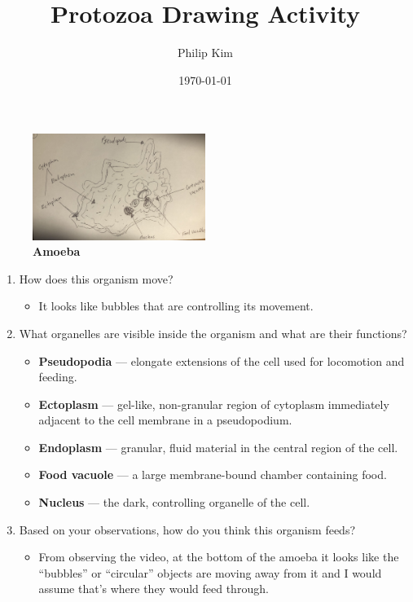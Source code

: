 \documentclass[a4paper]{article}
\title{Protozoa Drawing Activity}
\author{Philip Kim}
\date{\today}
\begin{document}
\maketitle
\begin{figure}[h]
  \centering
  \includegraphics[width=0.5\textwidth]{amoeba.jpeg}
  \caption{\textbf{Amoeba}}
\end{figure}
\begin{enumerate}
	\item How does this organism move?
	\begin{itemize}
    \item It looks like bubbles that are controlling its movement.
  \end{itemize}
	\item What organelles are visible inside the organism and what are their functions?
	\begin{itemize}
    \item \textbf{Pseudopodia} — elongate extensions of the cell used for locomotion and feeding.
    \item \textbf{Ectoplasm} — gel-like, non-granular region of cytoplasm immediately adjacent to the cell membrane in a pseudopodium.
    \item \textbf{Endoplasm} — granular, fluid material in the central region of the cell.
    \item \textbf{Food vacuole} — a large membrane-bound chamber containing food.
    \item \textbf{Nucleus} — the dark, controlling organelle of the cell.
  \end{itemize}
	\item Based on your observations, how do you think this organism feeds?
	\begin{itemize}
    \item From observing the video, at the bottom of the amoeba it looks like the ``bubbles'' or ``circular'' objects are moving away from it and I would assume that's where they would feed through.
  \end{itemize}
\end{enumerate}
\newpage
\end{document}
